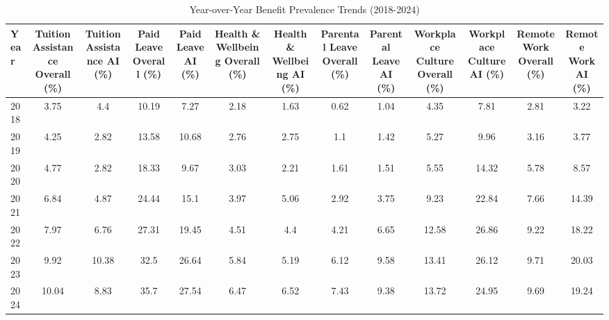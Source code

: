 \begin{table}[htbp]
\caption{Year-over-Year Benefit Prevalence Trends (2018-2024)}
\label{tab:yearly_benefit_trends}
\begin{tabular}{lcccccccccccc}
\hline\hline
Year & Tuition Assistance Overall (\%) & Tuition Assistance AI (\%) & Paid Leave Overall (\%) & Paid Leave AI (\%) & Health \& Wellbeing Overall (\%) & Health \& Wellbeing AI (\%) & Parental Leave Overall (\%) & Parental Leave AI (\%) & Workplace Culture Overall (\%) & Workplace Culture AI (\%) & Remote Work Overall (\%) & Remote Work AI (\%) \\
\hline
2018 & 3.75 & 4.4 & 10.19 & 7.27 & 2.18 & 1.63 & 0.62 & 1.04 & 4.35 & 7.81 & 2.81 & 3.22 \\
2019 & 4.25 & 2.82 & 13.58 & 10.68 & 2.76 & 2.75 & 1.1 & 1.42 & 5.27 & 9.96 & 3.16 & 3.77 \\
2020 & 4.77 & 2.82 & 18.33 & 9.67 & 3.03 & 2.21 & 1.61 & 1.51 & 5.55 & 14.32 & 5.78 & 8.57 \\
2021 & 6.84 & 4.87 & 24.44 & 15.1 & 3.97 & 5.06 & 2.92 & 3.75 & 9.23 & 22.84 & 7.66 & 14.39 \\
2022 & 7.97 & 6.76 & 27.31 & 19.45 & 4.51 & 4.4 & 4.21 & 6.65 & 12.58 & 26.86 & 9.22 & 18.22 \\
2023 & 9.92 & 10.38 & 32.5 & 26.64 & 5.84 & 5.19 & 6.12 & 9.58 & 13.41 & 26.12 & 9.71 & 20.03 \\
2024 & 10.04 & 8.83 & 35.7 & 27.54 & 6.47 & 6.52 & 7.43 & 9.38 & 13.72 & 24.95 & 9.69 & 19.24 \\
\hline\hline
\end{tabular}
\end{table}
